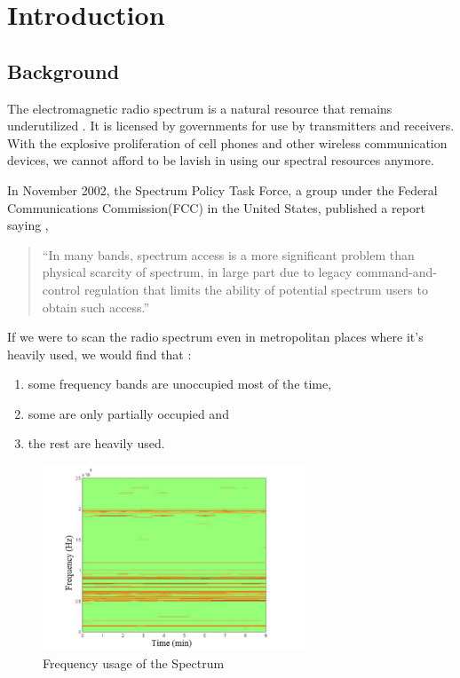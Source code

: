 \chapter{Introduction}
\section{Background}
The electromagnetic radio spectrum is a natural resource that remains 
underutilized \cite{haykin05}.
It is licensed by governments for use by transmitters and receivers.
With the explosive proliferation of cell phones and other wireless 
communication devices,
we cannot afford to be lavish in using our spectral resources anymore.

In November 2002, the Spectrum Policy Task Force, a group under the Federal
Communications Commission(FCC) in the United States, published a report saying
\cite{repFCC}, 
\begin{quote}
``In many bands, spectrum access is a more significant problem than physical 
scarcity of spectrum, in large part due to legacy command-and-control 
regulation that limits the ability of potential spectrum users to obtain such 
access.''
\end{quote}

If we were to scan the radio spectrum even in metropolitan places where it's
heavily used, 
we would find that \cite{staple04}:
\begin{enumerate}
	\item some frequency bands are unoccupied most of the time,
	\item some are only partially occupied and
	\item the rest are heavily used.
\end{enumerate}

\begin{figure}
\centering
\includegraphics[width=0.7\textwidth]{../images/freqUsage}
\caption{Frequency usage of the Spectrum}
\label{freqUsage}
\end{figure}

